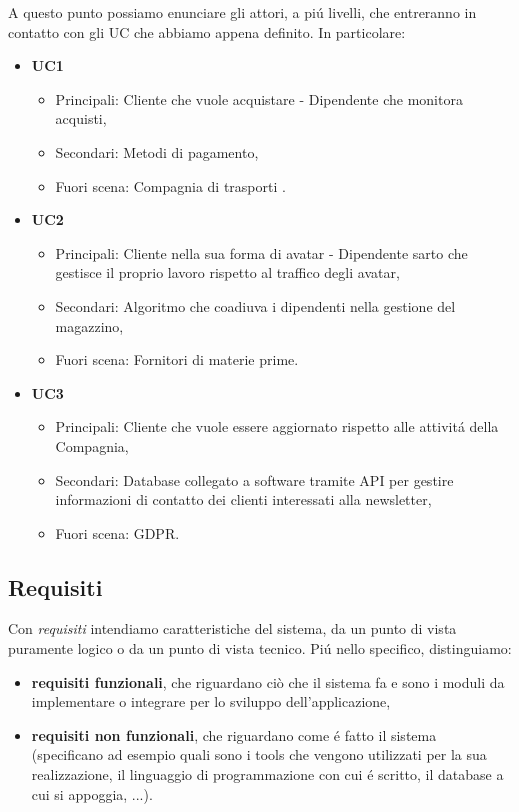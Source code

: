 \documentclass[12pt]{article}
\begin{document}
A questo punto possiamo enunciare gli attori, a pi\'u livelli, che entreranno in contatto con gli UC che abbiamo appena definito. In particolare:
\begin{itemize}
    \item \textbf{UC1}
        \begin{itemize}
        \item Principali: Cliente che vuole acquistare - Dipendente che monitora acquisti,
        \item Secondari: Metodi di pagamento,
        \item Fuori scena: Compagnia di trasporti .
        \end{itemize}
    \item \textbf{UC2}
        \begin{itemize}
        \item Principali: Cliente nella sua forma di avatar - Dipendente sarto che gestisce il proprio lavoro rispetto al traffico degli avatar,
        \item Secondari: Algoritmo che coadiuva i dipendenti nella gestione del magazzino,
        \item Fuori scena: Fornitori di materie prime.
        \end{itemize}
    \item \textbf{UC3}
        \begin{itemize}
        \item Principali: Cliente che vuole essere aggiornato rispetto alle attivit\'a della Compagnia, 
        \item Secondari: Database collegato a software tramite API per gestire informazioni di contatto dei clienti interessati alla newsletter,
        \item Fuori scena: GDPR.
        \end{itemize}
\end{itemize}

\subsection{Requisiti}

Con \textit{requisiti} intendiamo caratteristiche del sistema, da un punto di vista puramente logico o da un punto di vista tecnico. Pi\'u nello specifico, distinguiamo: 
\begin{itemize}
    \item \textbf{requisiti funzionali}, che riguardano ciò che il sistema fa e sono i moduli da implementare o integrare per lo sviluppo dell’applicazione,
    \item \textbf{requisiti non funzionali}, che riguardano come \'e fatto il sistema (specificano ad esempio quali sono i tools che vengono utilizzati per la sua realizzazione, il linguaggio di programmazione con cui \'e scritto, il database a cui si appoggia, ...).
\end{itemize}
\end{document}
